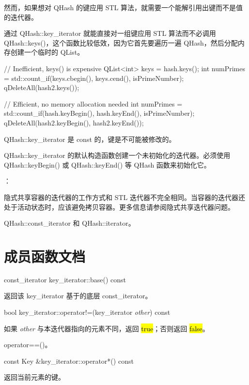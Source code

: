 然而，如果想对 QHash 的键应用 STL 算法，就需要一个能解引用出键而不是值
的迭代器。

通过 QHash::key\_iterator 就能直接对一组键应用 STL 算法而不必调用 QHash::keys()，这个函数比较低效，因为它首先要遍历一遍 QHash，然后分配内存创建一个临时的 QList。

\begin{cppcode}
// Inefficient, keys() is expensive
QList<int> keys = hash.keys();
int numPrimes = std::count_if(keys.cbegin(), keys.cend(), isPrimeNumber);
qDeleteAll(hash2.keys());

// Efficient, no memory allocation needed
int numPrimes = std::count_if(hash.keyBegin(), hash.keyEnd(), isPrimeNumber);
qDeleteAll(hash2.keyBegin(), hash2.keyEnd());
\end{cppcode}

QHash::key\_iterator 是 const 的，键是不可能被修改的。

QHash::key\_iterator 的默认构造函数创建一个未初始化的迭代器。必须使用 QHash::keyBegin() 或 QHash::keyEnd() 等 QHash 函数来初始化它。

\textbf{}： 

\begin{warning}
隐式共享容器的迭代器的工作方式和 STL 迭代器不完全相同。当容器的迭代器还处于活动状态时，应该避免拷贝容器。更多信息请参阅隐式共享迭代器问题。
\end{warning}

\begin{seeAlso}
QHash::const\_iterator 和 QHash::iterator。
\end{seeAlso}


\splitLine

\section{成员函数文档}

const\_iterator key\_iterator::base() const

返回该 key\_iterator 基于的底层 const\_iterator。

bool key\_iterator::operator!=(key\_iterator \emph{other}) const

如果 \emph{other} 与本迭代器指向的元素不同，返回 \hl{true}；否则返回 \hl{false}。


\begin{seeAlso}
operator==()。
\end{seeAlso}

const Key \&key\_iterator::operator*() const

返回当前元素的键。

